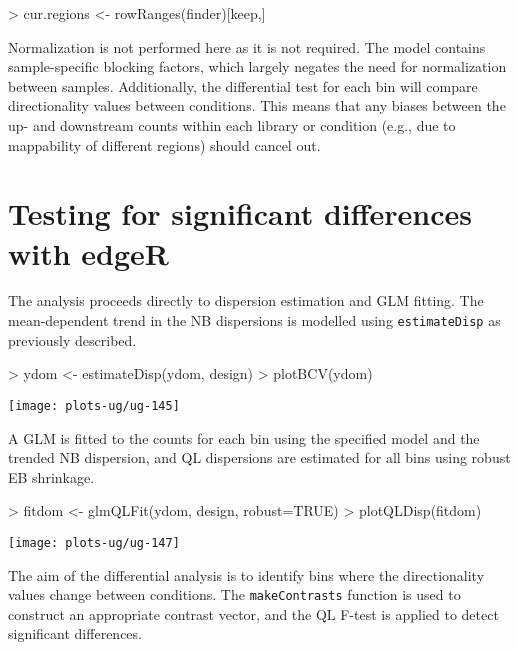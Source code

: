 \documentclass[12pt]{report}
\renewenvironment{Schunk}{\vspace{0pt}}{\vspace{0pt}}
\newcommand{\edgeR}{edgeR}
\newcommand{\code}[1]{{\small\texttt{#1}}}
\begin{document}
\begin{Schunk}
\begin{Sinput}
> cur.regions <- rowRanges(finder)[keep,]
\end{Sinput}
\end{Schunk}

Normalization is not performed here as it is not required. 
The model contains sample-specific blocking factors, which largely negates the need for normalization between samples.
Additionally, the differential test for each bin will compare directionality values between conditions.
This means that any biases between the up- and downstream counts within each library or condition (e.g., due to mappability of different regions) should cancel out.

\section{Testing for significant differences with \edgeR{}}
The analysis proceeds directly to dispersion estimation and GLM fitting.
The mean-dependent trend in the NB dispersions is modelled using \code{estimateDisp} as previously described.

\begin{Schunk}
\begin{Sinput}
> ydom <- estimateDisp(ydom, design)
> plotBCV(ydom)
\end{Sinput}
\end{Schunk}

\begin{center}
\texttt{[image: plots-ug/ug-145]}
\end{center}

A GLM is fitted to the counts for each bin using the specified model and the trended NB dispersion, and QL dispersions are estimated for all bins using robust EB shrinkage.

\begin{Schunk}
\begin{Sinput}
> fitdom <- glmQLFit(ydom, design, robust=TRUE)
> plotQLDisp(fitdom)
\end{Sinput}
\end{Schunk}

\begin{center}
\texttt{[image: plots-ug/ug-147]}
\end{center}


The aim of the differential analysis is to identify bins where the directionality values change between conditions.
The \code{makeContrasts} function is used to construct an appropriate contrast vector, and the QL F-test is applied to detect significant differences.
\end{document}
